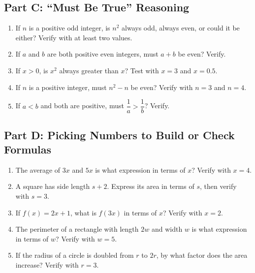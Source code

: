 \documentclass[14pt]{extarticle}
\begin{document}
\subsection*{Part C: ``Must Be True'' Reasoning}
\begin{enumerate}
  \item If \(n\) is a positive odd integer, is \(n^2\) always odd, always even, or could it be either? Verify with at least two values.
  \item If \(a\) and \(b\) are both positive even integers, must \(a + b\) be even? Verify.
  \item If \(x > 0\), is \(x^2\) always greater than \(x\)? Test with \(x = 3\) and \(x = 0.5\).
  \item If \(n\) is a positive integer, must \(n^2 - n\) be even? Verify with \(n = 3\) and \(n = 4\).
  \item If \(a < b\) and both are positive, must \(\dfrac{1}{a} > \dfrac{1}{b}\)? Verify.
\end{enumerate}

\subsection*{Part D: Picking Numbers to Build or Check Formulas}
\begin{enumerate}
  \item The average of \(3x\) and \(5x\) is what expression in terms of \(x\)? Verify with \(x = 4\).
  \item A square has side length \(s + 2\). Express its area in terms of \(s\), then verify with \(s = 3\).
  \item If \(f(x) = 2x + 1\), what is \(f(3x)\) in terms of \(x\)? Verify with \(x = 2\).
  \item The perimeter of a rectangle with length \(2w\) and width \(w\) is what expression in terms of \(w\)? Verify with \(w = 5\).
  \item If the radius of a circle is doubled from \(r\) to \(2r\), by what factor does the area increase? Verify with \(r = 3\).
\end{enumerate}
\end{document}

